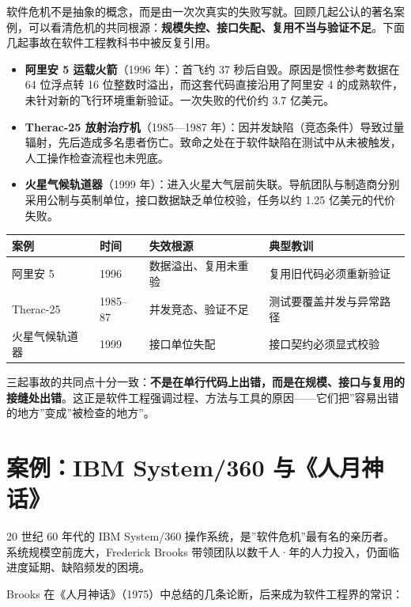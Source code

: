 \documentclass[
]{ctexbook}
\providecommand{\tightlist}{\setlength{\itemsep}{0pt}\setlength{\parskip}{0pt} }
\newcounter{none}
\begin{document}
软件危机不是抽象的概念，而是由一次次真实的失败写就。回顾几起公认的著名案例，可以看清危机的共同根源：\textbf{规模失控、接口失配、复用不当与验证不足}。下面几起事故在软件工程教科书中被反复引用。

\begin{itemize}
\tightlist
\item
  \textbf{阿里安 5 运载火箭}（1996 年）：首飞约 37
  秒后自毁。原因是惯性参考数据在 64 位浮点转 16
  位整数时溢出，而这套代码直接沿用了阿里安 4
  的成熟软件，未针对新的飞行环境重新验证。一次失败的代价约 3.7 亿美元。
\item
  \textbf{Therac-25 放射治疗机}（1985---1987
  年）：因并发缺陷（竞态条件）导致过量辐射，先后造成多名患者伤亡。致命之处在于软件缺陷在测试中从未被触发，人工操作检查流程也未兜底。
\item
  \textbf{火星气候轨道器}（1999
  年）：进入火星大气层前失联。导航团队与制造商分别采用公制与英制单位，接口数据缺乏单位校验，任务以约
  1.25 亿美元的代价失败。
\end{itemize}

{\def\LTcaptype{none} %
\begin{longtable}[]{@{}llll@{}}
\toprule\noalign{}
案例 & 时间 & 失效根源 & 典型教训 \\
\midrule\noalign{}
\endhead
\bottomrule\noalign{}
\endlastfoot
阿里安 5 & 1996 & 数据溢出、复用未重验 & 复用旧代码必须重新验证 \\
Therac-25 & 1985--87 & 并发竞态、验证不足 & 测试要覆盖并发与异常路径 \\
火星气候轨道器 & 1999 & 接口单位失配 & 接口契约必须显式校验 \\
\end{longtable}
}

三起事故的共同点十分一致：\textbf{不是在单行代码上出错，而是在规模、接口与复用的接缝处出错}。这正是软件工程强调过程、方法与工具的原因------它们把''容易出错的地方''变成''被检查的地方''。

\section{案例：IBM System/360
与《人月神话》}\label{ux6848ux4f8bibm-system360-ux4e0eux4ebaux6708ux795eux8bdd}

20 世纪 60 年代的 IBM System/360
操作系统，是''软件危机''最有名的亲历者。系统规模空前庞大，Frederick
Brooks 带领团队以数千人·年的人力投入，仍面临进度延期、缺陷频发的困境。

Brooks
在《人月神话》（1975）中总结的几条论断，后来成为软件工程界的常识：
\end{document}
